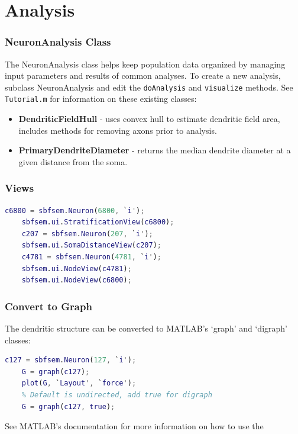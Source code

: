 \documentclass[11pt]{beamer}
\begin{document}
\section{Analysis}
\begin{frame}
	\frametitle{NeuronAnalysis Class}
	The NeuronAnalysis class helps keep population data organized by managing input parameters and results of common analyses. To create a new analysis, subclass NeuronAnalysis and edit the \texttt{doAnalysis} and \texttt{visualize} methods.
	\vskip10pt
	See \texttt{Tutorial.m} for information on these existing classes:
	\begin{itemize}
		\item \textbf{DendriticFieldHull} - uses convex hull to estimate dendritic field area, includes methods for removing axons prior to analysis.
		\item \textbf{PrimaryDendriteDiameter} - returns the median dendrite diameter at a given distance from the soma.
	\end{itemize}
\end{frame}
\begin{frame}[fragile]
	\frametitle{Views}
	\begin{lstlisting}[language = matlab]
	c6800 = sbfsem.Neuron(6800, `i');
	sbfsem.ui.StratificationView(c6800);
	c207 = sbfsem.Neuron(207, `i');
	sbfsem.ui.SomaDistanceView(c207);
	c4781 = sbfsem.Neuron(4781, `i');
	sbfsem.ui.NodeView(c4781);
	sbfsem.ui.NodeView(c6800);\end{lstlisting}
\end{frame}
\begin{frame}[fragile]
	\frametitle{Convert to Graph}
	The dendritic structure can be converted to MATLAB's `graph' and `digraph' classes:
	\begin{lstlisting}[language=matlab]
	c127 = sbfsem.Neuron(127, `i');
	G = graph(c127);
	plot(G, `Layout', `force');
	% Default is undirected, add true for digraph
	G = graph(c127, true);\end{lstlisting}
	See MATLAB's documentation for more information on how to use the %
\end{frame}
\end{document}

